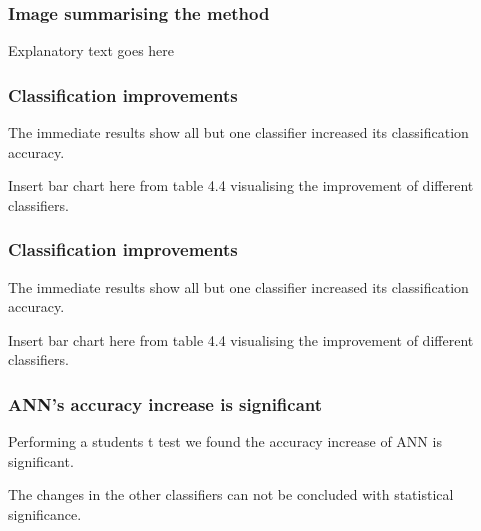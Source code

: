 \documentclass[aspectratio=1610]{beamer}
\begin{document}
\begin{frame}
  \frametitle{\hfill Image summarising the method}
  \begin{figure}[htp]
    \centering
  \end{figure}
  Explanatory text goes here
\end{frame}


\begin{frame}
  \frametitle{\hfill Classification improvements}
  The immediate results show all but one classifier increased its classification accuracy.

  Insert bar chart here from table 4.4 visualising the improvement of different classifiers.
\end{frame}

\begin{frame}
  \frametitle{\hfill Classification improvements}
  The immediate results show all but one classifier increased its classification accuracy.

  Insert bar chart here from table 4.4 visualising the improvement of different classifiers.
\end{frame}

\begin{frame}
  \frametitle{\hfill ANN's accuracy increase is significant}

  Performing a students t test we found the accuracy increase of ANN is significant.

  The changes in the other classifiers can not be concluded with statistical significance.
\end{frame}
\end{document}
